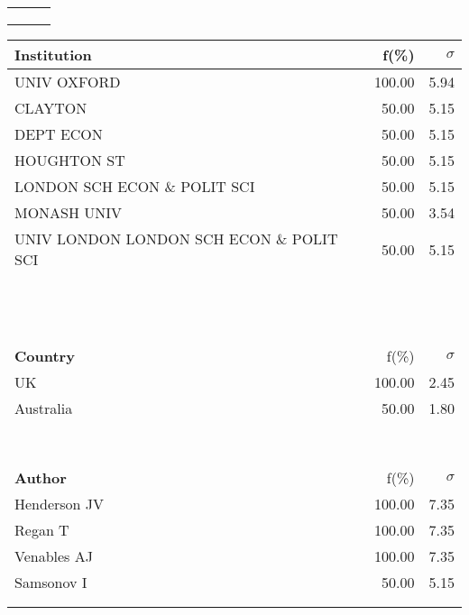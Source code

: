 \documentclass[a4paper,11pt]{report}
\begin{document}
\begin{landscape}
\begin{table}[!ht]
{\begin{tabular}{|p{5cm} r r|}
 &  & \\
 &  & \\
 &  & \\
\hline
\end{tabular}
}
{\scriptsize\begin{tabular}{|p{5cm} r r|}
\hline
{\bf Institution }& f(\%) & $\sigma$\\
\hline
UNIV OXFORD & 100.00 & 5.94\\
CLAYTON & 50.00 & 5.15\\
DEPT ECON & 50.00 & 5.15\\
HOUGHTON ST & 50.00 & 5.15\\
LONDON SCH ECON \& POLIT SCI & 50.00 & 5.15\\
MONASH UNIV & 50.00 & 3.54\\
UNIV LONDON LONDON SCH ECON \& POLIT SCI & 50.00 & 5.15\\
 &  & \\
 &  & \\
 &  & \\
 &  & \\
 &  & \\
 &  & \\
 &  & \\
 &  & \\
 &  & \\
 &  & \\
 &  & \\
 &  & \\
 &  & \\
\hline
{\bf Country }& f(\%) & $\sigma$\\
\hline
UK & 100.00 & 2.45\\
Australia & 50.00 & 1.80\\
 &  & \\
 &  & \\
 &  & \\
 &  & \\
 &  & \\
 &  & \\
 &  & \\
 &  & \\
\hline
{\bf Author }& f(\%) & $\sigma$\\
\hline
Henderson JV & 100.00 & 7.35\\
Regan T & 100.00 & 7.35\\
Venables AJ & 100.00 & 7.35\\
Samsonov I & 50.00 & 5.15\\
 &  & \\
 &  & \\

\end{tabular}}
\end{table}
\end{landscape}
\end{document}
